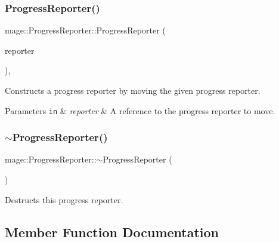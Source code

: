 \subsubsection{\texorpdfstring{Progress\+Reporter()}{ProgressReporter()}\hspace{0.1cm}{\footnotesize\ttfamily [3/3]}}
{\footnotesize\ttfamily mage\+::\+Progress\+Reporter\+::\+Progress\+Reporter (\begin{DoxyParamCaption}\item[{\mbox{\hyperlink{classmage_1_1_progress_reporter}{Progress\+Reporter}} \&\&}]{reporter }\end{DoxyParamCaption})\hspace{0.3cm}{\ttfamily [default]}, {\ttfamily [noexcept]}}

Constructs a progress reporter by moving the given progress reporter.


\begin{DoxyParams}[1]{Parameters}
\mbox{\tt in}  & {\em reporter} & A reference to the progress reporter to move. \\
\hline
\end{DoxyParams}
\mbox{\label{classmage_1_1_progress_reporter_aa543239c6dd4474a77cf4cf6904c1b26}} 
\subsubsection{\texorpdfstring{$\sim$\+Progress\+Reporter()}{~ProgressReporter()}}
{\footnotesize\ttfamily mage\+::\+Progress\+Reporter\+::$\sim$\+Progress\+Reporter (\begin{DoxyParamCaption}{ }\end{DoxyParamCaption})\hspace{0.3cm}{\ttfamily [default]}}

Destructs this progress reporter. 

\subsection{Member Function Documentation}
\mbox{\label{classmage_1_1_progress_reporter_a11d758647ac2082bc296ab53a7454eaa}} 
